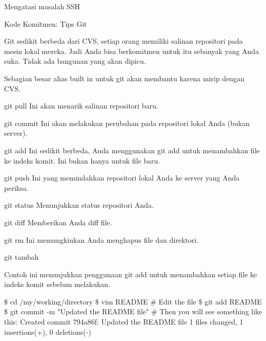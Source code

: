 \noindent 
Mengatasi masalah SSH \par
\vspace{12pt}
\noindent 
 $  $Kode Komitmen: Tips Git \par
\vspace{12pt}
\noindent 
Git sedikit berbeda dari CVS, setiap orang memiliki salinan repositori pada mesin lokal mereka. $  $Jadi Anda bisa berkomitmen untuk itu sebanyak yang Anda suka. $  $Tidak ada bangunan yang akan dipicu. \par
\vspace{12pt}
\noindent 
Sebagian besar alias built in untuk git akan membantu karena mirip dengan CVS. \par
\vspace{12pt}
\noindent 
git pull $  $Ini akan menarik salinan repositori baru. \par
\vspace{12pt}
\noindent 
git commit $  $Ini akan melakukan perubahan pada repositori lokal Anda (bukan server). \par
\vspace{12pt}
\noindent 
git add $  $Ini sedikit berbeda, Anda menggunakan git add untuk menambahkan file ke indeks komit. $  $Ini bukan hanya untuk file baru. \par
\vspace{12pt}
\noindent 
git push $  $Ini yang memindahkan repositori lokal Anda ke server yang Anda periksa. \par
\vspace{12pt}
\noindent 
git status $  $Menunjukkan status repositori Anda. \par
\vspace{12pt}
\noindent 
git diff $  $Memberikan Anda diff file. \par
\vspace{12pt}
\noindent 
git rm $  $Ini memungkinkan Anda menghapus file dan direktori. \par
\vspace{12pt}
\noindent 
 $  $git tambah \par
\vspace{12pt}
\noindent 
Contoh ini menunjukkan penggunaan git add untuk menambahkan setiap file ke indeks komit sebelum melakukan. \par
\vspace{12pt}
\noindent 
  $  \$  $ cd /my/working/directory  $  \$  $ vim README  $  \#  $ Edit the file  $  \$  $ git add README  $  \$  $ git commit -m "Updated the README file"  $  \#  $ Then you will see something like this: Created commit 794a86f: Updated the README file 1 files changed, 1 insertions(+), 0 deletions(-)  \par
